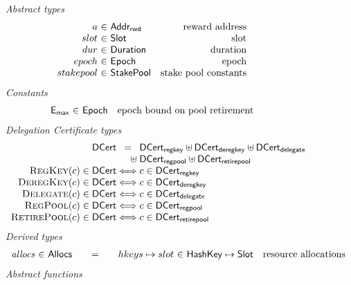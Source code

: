 \begin{figure}
  \emph{Abstract types}
  \begin{equation*}
    \begin{array}{r@{~\in~}lr}
      a & \AddrRWD & \text{reward address} \\
      slot & \Slot & \text{slot}\\
      dur & \Duration & \text{duration}\\
      epoch & \Epoch & \text{epoch} \\
      stakepool & \StakePool & \text{stake pool constants}
    \end{array}
  \end{equation*}
  \emph{Constants}
  \begin{equation*}
    \begin{array}{r@{~\in~}lr}
      \emax & \Epoch & \text{epoch bound on pool retirement}
    \end{array}
  \end{equation*}
  \emph{Delegation Certificate types}
  \begin{equation*}
  \begin{array}{r@{}c@{}l}
    \DCert &=& \DCertRegKey \uniondistinct \DCertDeRegKey \uniondistinct \DCertDeleg \\
                &\hfill\uniondistinct\;& \DCertRegPool \uniondistinct \DCertRetirePool \\
    \RegKey{c} \in \DCert &\iff& c \in \DCertRegKey \\
    \DeregKey{c} \in \DCert &\iff& c \in \DCertDeRegKey \\
    \Delegate{c} \in \DCert &\iff& c \in \DCertDeleg \\
    \RegPool{c} \in \DCert &\iff& c \in \DCertRegPool\\
    \RetirePool{c} \in \DCert &\iff& c \in \DCertRetirePool \\
  \end{array}
  \end{equation*}
  \emph{Derived types}
  \begin{equation*}
    \begin{array}{r@{~\in~}l@{\qquad=\qquad}r@{~\in~}lr}
      \var{allocs}
      & \Allocs
      & hkeys \mapsto slot
      & \HashKey \mapsto \Slot
      & \text{resource allocations}
    \end{array}
  \end{equation*}
  \emph{Abstract functions}
  \begin{equation*}

\end{equation*}
\end{figure}
